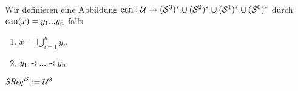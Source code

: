 \begin{dfn}\ \\
    Wir definieren eine Abbildung $\text{can}: \mathcal{U} \to (\mathcal{S}^3)^* \cup (\mathcal{S}^2)^* \cup (\mathcal{S}^1)^* \cup (\mathcal{S}^0)^*$ durch $\text{can}(x) = y_1 ... y_n$ falls
    \begin{enumerate}
        \item $x = \bigcup_{i=1}^n y_i$.
        \item $y_1 \prec ... \prec y_n$
    \end{enumerate}
\end{dfn}




\begin{dfn}[$\GSReg$]
    $\mathit{S\hspace*{-0.25ex}Reg}^B := \mathcal{U}^3$
\end{dfn}


